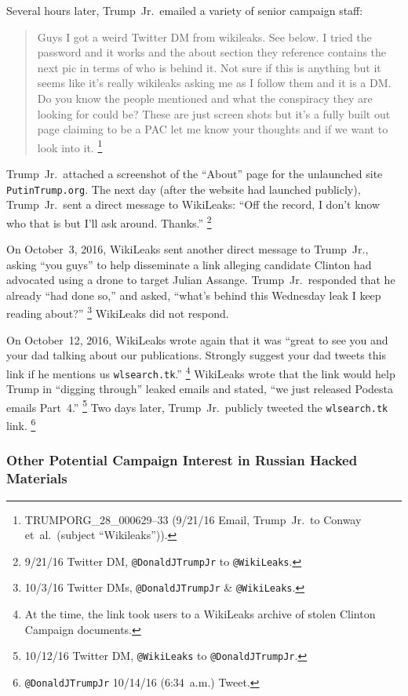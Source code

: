 Several hours later, Trump~Jr.\ emailed a variety of senior campaign staff:

\begin{quote}
Guys I got a weird Twitter DM from wikileaks.
See below.
I tried the password and it works and the about section they reference contains the next pic in terms of who is behind it.
Not sure if this is anything but it seems like it's really wikileaks asking me as I follow them and it is a DM\null.
Do you know the people mentioned and what the conspiracy they are looking for could be?
These are just screen shots but it's a fully built out page claiming to be a PAC let me know your thoughts and if we want to look into it.%
\footnote{TRUMPORG\_28\_000629--33 (9/21/16 Email, Trump~Jr.\ to Conway et~al.\ (subject ``Wikileaks'')).}
\end{quote}

Trump~Jr.\ attached a screenshot of the ``About'' page for the unlaunched site \verb+PutinTrump.org+.
The next day (after the website had launched publicly), Trump~Jr.\ sent a direct message to WikiLeaks:
``Off the record, I don't know who that is but I'll ask around. Thanks.''%
\footnote{9/21/16 Twitter DM, \verb+@DonaldJTrumpJr+ to \verb+@WikiLeaks+.}

On October~3, 2016, WikiLeaks sent another direct message to Trump~Jr., asking ``you guys'' to help disseminate a link alleging candidate Clinton had advocated using a drone to target Julian Assange.
Trump~Jr.\ responded that he already ``had done so,'' and asked, ``what's behind this Wednesday leak I keep reading about?''%
\footnote{10/3/16 Twitter DMs, \verb+@DonaldJTrumpJr+ \& \verb+@WikiLeaks+.}
WikiLeaks did not respond.

On October~12, 2016, WikiLeaks wrote again that it was ``great to see you and your dad talking about our publications.
Strongly suggest your dad tweets this link if he mentions us \verb+wlsearch.tk+.''%
\footnote{At the time, the link took users to a WikiLeaks archive of stolen Clinton Campaign documents.}
WikiLeaks wrote that the link would help Trump in ``digging through'' leaked emails and stated, ``we just released Podesta emails Part~4.''%
\footnote{10/12/16 Twitter DM, \verb+@WikiLeaks+ to \verb+@DonaldJTrumpJr+.}
Two days later, Trump~Jr.\ publicly tweeted the \verb+wlsearch.tk+ link.%
\footnote{\verb+@DonaldJTrumpJr+ 10/14/16 (6:34~a.m.) Tweet.}

\subsubsection{Other Potential Campaign Interest in Russian Hacked Materials}

